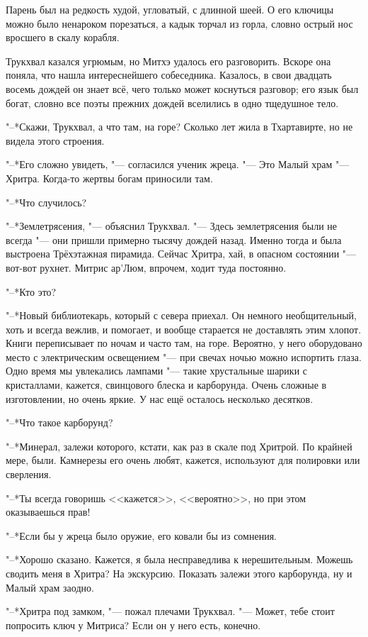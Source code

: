 \documentclass[a4paper,10pt,fleqn]{book}
\begin{document}
Парень был на редкость худой, угловатый, с длинной шеей.
О его ключицы можно было ненароком порезаться, а кадык торчал из горла, словно острый нос вросшего в скалу корабля.

Трукхвал казался угрюмым, но Митхэ удалось его разговорить.
Вскоре она поняла, что нашла интереснейшего собеседника.
Казалось, в свои двадцать восемь дождей он знает всё, чего только может коснуться разговор;
его язык был богат, словно все поэты прежних дождей вселились в одно тщедушное тело.

"--*Скажи, Трукхвал, а что там, на горе?
Сколько лет жила в Тхартавирте, но не видела этого строения.

"--*Его сложно увидеть, "--- согласился ученик жреца.
"--- Это Малый храм "--- Хритра.
Когда-то жертвы богам приносили там.

"--*Что случилось?

"--*Землетрясения, "--- объяснил Трукхвал.
"--- Здесь землетрясения были не всегда "--- они пришли примерно тысячу дождей назад.
Именно тогда и была выстроена Трёхэтажная пирамида.
Сейчас Хритра, хай, в опасном состоянии "--- вот-вот рухнет.
Митрис ар'Люм, впрочем, ходит туда постоянно.

"--*Кто это?

"--*Новый библиотекарь, который с севера приехал.
Он немного необщительный, хоть и всегда вежлив, и помогает, и вообще старается не доставлять этим хлопот.
Книги переписывает по ночам и часто там, на горе.
Вероятно, у него оборудовано место с электрическим освещением "--- при свечах ночью можно испортить глаза.
Одно время мы увлекались лампами "--- такие хрустальные шарики с кристаллами, кажется, свинцового блеска и карборунда.
Очень сложные в изготовлении, но очень яркие.
У нас ещё осталось несколько десятков.

"--*Что такое карборунд?

"--*Минерал, залежи которого, кстати, как раз в скале под Хритрой.
По крайней мере, были.
Камнерезы его очень любят, кажется, используют для полировки или сверления.

"--*Ты всегда говоришь <<кажется>>, <<вероятно>>, но при этом оказываешься прав!

"--*Если бы у жреца было оружие, его ковали бы из сомнения.

"--*Хорошо сказано.
Кажется, я была несправедлива к нерешительным.
Можешь сводить меня в Хритра?
На экскурсию.
Показать залежи этого карборунда, ну и Малый храм заодно.

"--*Хритра под замком, "--- пожал плечами Трукхвал.
"--- Может, тебе стоит попросить ключ у Митриса?
Если он у него есть, конечно.
\end{document}
